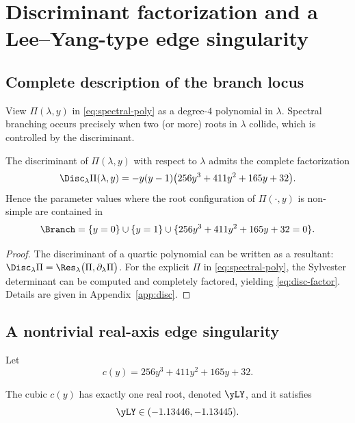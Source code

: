 \section{Discriminant factorization and a Lee--Yang-type edge singularity}\label{sec:disc}

\subsection{Complete description of the branch locus}

View \(\Pi(\lambda,y)\) in \eqref{eq:spectral-poly} as a degree-\(4\) polynomial in \(\lambda\).
Spectral branching occurs precisely when two (or more) roots in \(\lambda\) collide, which is controlled by the discriminant.

\begin{theorem}\label{thm:disc-factor}
The discriminant of \(\Pi(\lambda,y)\) with respect to \(\lambda\) admits the complete factorization
\begin{equation}\label{eq:disc-factor}
\Disc_{\lambda}\Pi(\lambda,y)=-y(y-1)\bigl(256y^3+411y^2+165y+32\bigr).
\end{equation}
Hence the parameter values where the root configuration of \(\Pi(\cdot,y)\) is non-simple are contained in
\[
\Branch=\{y=0\}\cup\{y=1\}\cup\{256y^3+411y^2+165y+32=0\}.
\]
\end{theorem}

\begin{proof}
The discriminant of a quartic polynomial can be written as a resultant:
\(\Disc_{\lambda}\Pi=\Res_{\lambda}\bigl(\Pi,\partial_{\lambda}\Pi\bigr)\).
For the explicit \(\Pi\) in \eqref{eq:spectral-poly}, the Sylvester determinant can be computed and completely factored, yielding \eqref{eq:disc-factor}.
Details are given in Appendix~\ref{app:disc}.
\end{proof}

\subsection{A nontrivial real-axis edge singularity}

Let
\begin{equation}\label{eq:cubic}
c(y)=256y^3+411y^2+165y+32.
\end{equation}

\begin{proposition}\label{prop:unique-real-root}
The cubic \(c(y)\) has exactly one real root, denoted \(\yLY\), and it satisfies
\[
\yLY\in(-1.13446,-1.13445).
\]
\end{proposition}

